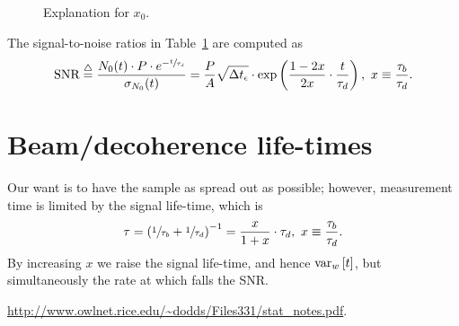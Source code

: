 \documentclass{article}
\newcommand{\dt}{\Delta t}
\newcommand{\dtm}{\dt_{\meas}}
\newcommand{\LTb}{\tau_b}
\newcommand{\LTd}{\tau_d}
\begin{document}
\begin{figure}[h]
	\centering
	\caption{Explanation for $x_0$\label{fig:x0Expl}.}
\end{figure}

\newcommand{\SNR}{\text{SNR}}
\newcommand{\deq}{\overset{\triangle}{=}}
The signal-to-noise ratios in Table~\ref{fig:x0Expl} are computed as 
\begin{equation}\label{eq:TauRatioSNR}
	\SNR \deq \frac{N_0(t)\cdot P\cdot e^{-\sfrac{t}{\LTd}}}{\SD{N_0}(t)} 
	= \frac{P}{A}\sqrt{\dtm}\cdot\exp\bkt{\frac{1-2x}{2x}\cdot\frac{t}{\LTd}},~ x\equiv \frac{\LTb}{\LTd}.
\end{equation}

\section{Beam/decoherence life-times}

Our want is to have the sample as spread out as possible; however, measurement time is limited by the signal life-time, which is 
\[
	\tau = \bkt{\sfrac{1}{\LTb} + \sfrac{1}{\LTd}}^{-1} = \frac{x}{1+x}\cdot \LTd,~ x \equiv \frac{\LTb}{\LTd}.
\]
By increasing $x$ we raise the signal life-time, and hence $\var[w]{t}$, but simultaneously the rate at which falls the SNR.


\begin{thebibliography}{9}
	\url{http://www.owlnet.rice.edu/~dodds/Files331/stat_notes.pdf}.
\end{thebibliography}
\end{document}
